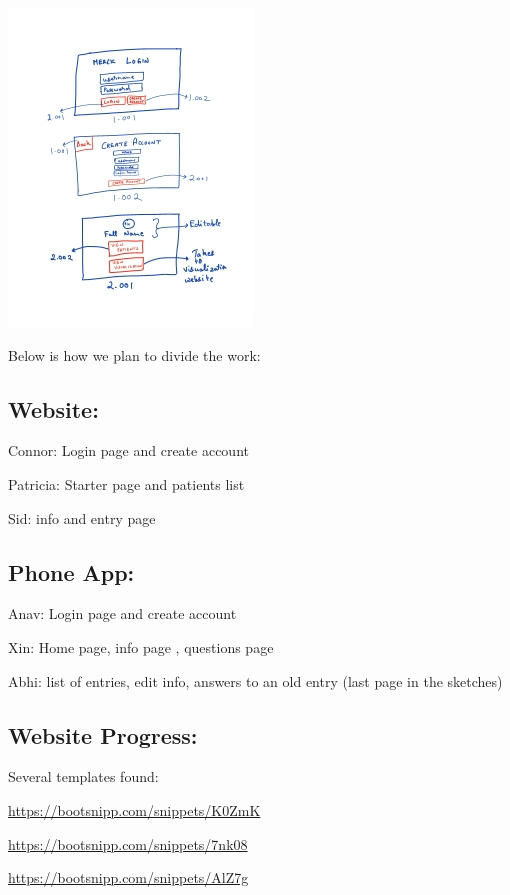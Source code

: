\documentclass[]{book}
\begin{document}
\includegraphics{images/page1_001.jpg}

Below is how we plan to divide the work:

\hypertarget{website}{%
\subsection{Website:}\label{website}}

Connor: Login page and create account

Patricia: Starter page and patients list

Sid: info and entry page

\hypertarget{phone-app}{%
\subsection{Phone App:}\label{phone-app}}

Anav: Login page and create account

Xin: Home page, info page , questions page

Abhi: list of entries, edit info, answers to an old entry (last page in the sketches)

\hypertarget{website-progress}{%
\subsection{Website Progress:}\label{website-progress}}

Several templates found:

\url{https://bootsnipp.com/snippets/K0ZmK}

\url{https://bootsnipp.com/snippets/7nk08}

\url{https://bootsnipp.com/snippets/AlZ7g}
\end{document}
